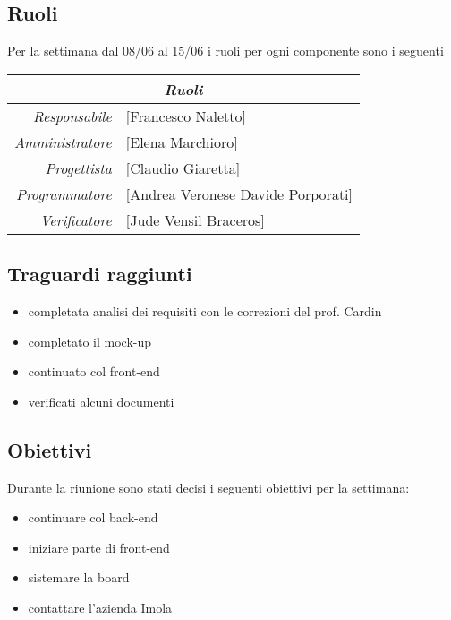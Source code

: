 \documentclass[12pt]{article}
\begin{document}
\subsection{Ruoli}
Per la settimana dal 08/06 al 15/06 i ruoli per ogni componente sono i seguenti
\\
\begin{tabular}{r | l}
    \multicolumn{2}{c}{\textit{Ruoli}}\\
    \hline
        \textit{Responsabile} &
        [Francesco Naletto]\makecell{}\\
        \textit{Amministratore} &
        [Elena Marchioro]\makecell{}\\
        \textit{Progettista} &
        [Claudio Giaretta]\makecell{}\\
        \textit{Programmatore} &
        [Andrea Veronese Davide Porporati]\makecell{}\\
        \textit{Verificatore} & 
        [Jude Vensil Braceros]\makecell{}\\
\end{tabular}

\subsection{Traguardi raggiunti}
\begin{itemize}
    \item completata analisi dei requisiti con le correzioni del prof. Cardin
    \item completato il mock-up
    \item continuato col front-end
    \item verificati alcuni documenti
    
\end{itemize}

\subsection{Obiettivi}
Durante la riunione sono stati decisi i seguenti obiettivi per la settimana:
\begin{itemize}
    \item continuare col back-end
    \item iniziare parte di front-end
    \item sistemare la board
    \item contattare l’azienda Imola
    
\end{itemize}
\end{document}
